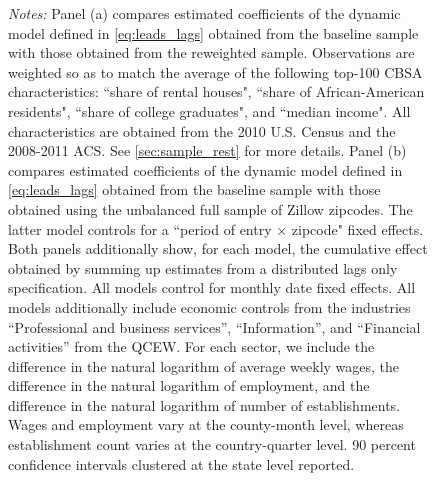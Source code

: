 \begin{figure}[htb!]
\begin{minipage}{\textwidth}
		\textit{Notes:} Panel (a) compares estimated coefficients of the dynamic model defined in 
		\autoref{eq:leads_lags} obtained from the baseline sample with those obtained from the 
		reweighted sample. Observations are weighted so as to match the average of the following 
		top-100 CBSA characteristics: ``share of rental houses", ``share of African-American 
		residents", ``share of college graduates", and ``median income". All characteristics are 
		obtained from the 2010 U.S. Census and the 2008-2011 ACS. See \autoref{sec:sample_rest} for 
		more details. Panel (b) compares estimated coefficients of the dynamic model defined in 
		\autoref{eq:leads_lags} obtained from the baseline sample with those obtained using the 
		unbalanced full sample of Zillow zipcodes. The latter model controls for a ``period of 
		entry $\times$ zipcode" fixed effects. Both panels additionally show, for each model, the 
		cumulative effect obtained by summing up estimates from a distributed lags only specification. 
		All models control for monthly date fixed effects. All models additionally include economic 
		controls from the industries ``Professional and business services'', ``Information'', and 
		``Financial activities'' from the QCEW. For each sector, we include the difference in the 
		natural logarithm of average weekly wages, the difference in the natural logarithm of 
		employment, and the difference in the natural logarithm of number of establishments. Wages 
		and employment vary at the county-month level, whereas establishment count varies at the 
		country-quarter level.
		90 percent confidence intervals clustered at the state level reported. 
	\end{minipage}
\end{figure}


